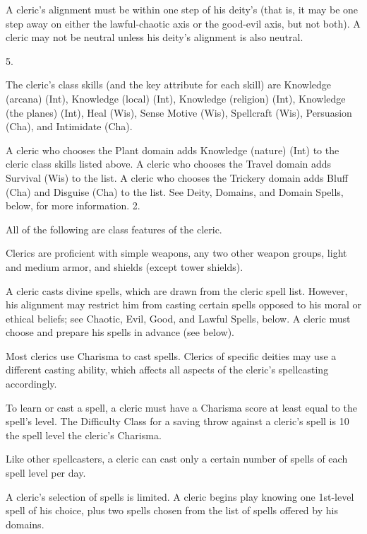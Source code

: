  A cleric's alignment must be within one step of his deity's (that is, it
may be one step away on either the lawful-chaotic axis or the good-evil
axis, but not both). A cleric may not be neutral unless his deity's alignment is also neutral.

 5.

The cleric's class skills (and the key attribute for each skill) are Knowledge (arcana) (Int), Knowledge (local) (Int), Knowledge (religion) (Int), Knowledge (the planes) (Int), Heal (Wis), Sense Motive (Wis), Spellcraft (Wis), Persuasion (Cha), and Intimidate (Cha).

 A cleric who chooses the Plant domain adds Knowledge (nature) (Int) to the cleric class skills listed above. A cleric who chooses the Travel domain adds Survival (Wis) to the list. A cleric who chooses the Trickery domain adds Bluff (Cha) and Disguise (Cha) to the list. See Deity, Domains, and Domain Spells, below, for more information.
 2.

All of the following are class features of the cleric.

   Clerics are proficient with simple weapons, any two other weapon groups, light and medium armor, and shields (except tower shields).

  A cleric casts divine spells, which are drawn from the cleric spell list. However, his alignment may restrict him from casting certain spells opposed to his moral or ethical beliefs; see Chaotic, Evil, Good, and Lawful Spells, below. A cleric must choose and prepare his spells in advance (see below).

Most clerics use Charisma to cast spells. Clerics of specific deities may use a different casting ability, which affects all aspects of the cleric's spellcasting accordingly.

To learn or cast a spell, a cleric must have a Charisma score at least equal to the spell's level. The Difficulty Class for a saving throw against a cleric's spell is 10 \add the spell level \add the cleric's Charisma.

Like other spellcasters, a cleric can cast only a certain number of spells of each spell level per day.

\par A cleric's selection of spells is limited. A cleric begins play knowing one 1st-level spell of his choice, plus two spells chosen from the list of spells offered by his domains.


